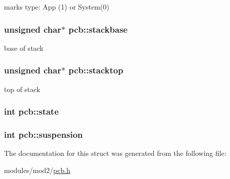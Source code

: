 marks type\+: App (1) or System(0) 

\hypertarget{structpcb_abc1b0e6ef9a587d2cdf18456c9197df8}{}
\subsubsection[{stackbase}]{\setlength{\rightskip}{0pt plus 5cm}unsigned char$\ast$ pcb\+::stackbase}\label{structpcb_abc1b0e6ef9a587d2cdf18456c9197df8}


base of stack 

\hypertarget{structpcb_a625a19ac788246815a5cd923d9ca4db0}{}
\subsubsection[{stacktop}]{\setlength{\rightskip}{0pt plus 5cm}unsigned char$\ast$ pcb\+::stacktop}\label{structpcb_a625a19ac788246815a5cd923d9ca4db0}


top of stack 

\hypertarget{structpcb_ab97f8ca3e24782ed25b0cb4f21c351dc}{}
\subsubsection[{state}]{\setlength{\rightskip}{0pt plus 5cm}int pcb\+::state}\label{structpcb_ab97f8ca3e24782ed25b0cb4f21c351dc}
\hypertarget{structpcb_a76bef8d53d5c9a9d330a0f2933795289}{}
\subsubsection[{suspension}]{\setlength{\rightskip}{0pt plus 5cm}int pcb\+::suspension}\label{structpcb_a76bef8d53d5c9a9d330a0f2933795289}


The documentation for this struct was generated from the following file\+:\begin{DoxyCompactItemize}
\item 
modules/mod2/\hyperlink{pcb_8h}{pcb.\+h}\end{DoxyCompactItemize}
